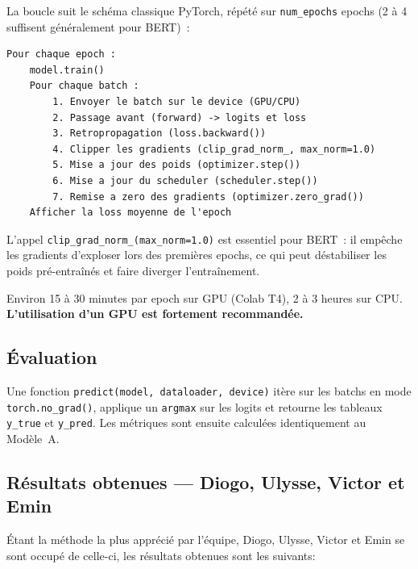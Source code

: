 \documentclass[12pt,a4paper]{report}
\begin{document}
La boucle suit le schéma classique PyTorch, répété sur \texttt{num\_epochs} epochs
(2 à 4 suffisent généralement pour BERT)~:

\begin{lstlisting}[language={}]
Pour chaque epoch :
    model.train()
    Pour chaque batch :
        1. Envoyer le batch sur le device (GPU/CPU)
        2. Passage avant (forward) -> logits et loss
        3. Retropropagation (loss.backward())
        4. Clipper les gradients (clip_grad_norm_, max_norm=1.0)
        5. Mise a jour des poids (optimizer.step())
        6. Mise a jour du scheduler (scheduler.step())
        7. Remise a zero des gradients (optimizer.zero_grad())
    Afficher la loss moyenne de l'epoch
\end{lstlisting}

\begin{warn}
L'appel \texttt{clip\_grad\_norm\_(max\_norm=1.0)} est essentiel pour BERT~: il empêche
les gradients d'exploser lors des premières epochs, ce qui peut déstabiliser les poids
pré-entraînés et faire diverger l'entraînement.
\end{warn}

\begin{warn}
Environ 15 à 30 minutes par epoch sur GPU (Colab T4), 2 à 3 heures sur CPU.
\textbf{L'utilisation d'un GPU est fortement recommandée.}
\end{warn}

\subsection{Évaluation}

Une fonction \texttt{predict(model, dataloader, device)} itère sur les batchs en mode \\
\texttt{torch.no\_grad()}, applique un \texttt{argmax} sur les logits et retourne les
tableaux \texttt{y\_true} et \texttt{y\_pred}. Les métriques sont ensuite calculées
identiquement au Modèle~A.

\pagebreak

\subsection{Résultats obtenues — Diogo, Ulysse, Victor et Emin}

Étant la méthode la plus apprécié par l'équipe, Diogo, Ulysse, Victor et Emin se sont occupé de 
celle-ci, les résultats obtenues sont les suivants:\\
\end{document}
